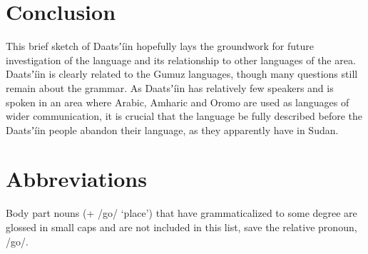 \documentclass[output=paper]{langsci/langscibook}
\begin{document}
\section{Conclusion}\label{sec:ahlandc:12}

This brief sketch of Daatsʼíin hopefully lays the groundwork for future investigation of the language and its relationship to other languages of the area. Daatsʼíin is clearly related to the Gumuz languages, though many questions still remain about the grammar. As Daatsʼíin has relatively few speakers and is spoken in an area where Arabic, Amharic and Oromo are used as languages of wider communication, it is crucial that the language be fully described before the Daatsʼíin people abandon their language, as they apparently have in Sudan.

\section*{Abbreviations}

Body part nouns (+ /go/ ‘place’) that have grammaticalized to some degree are glossed in small caps and are not included in this list, save the relative pronoun, /go/.
\end{document}

